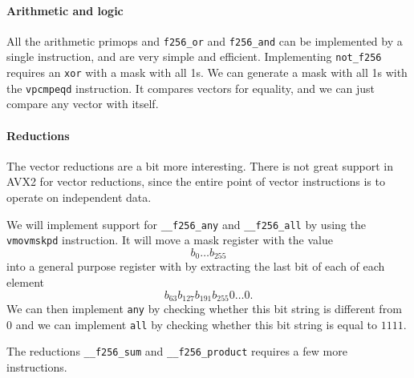 \documentclass{article}
\begin{document}
\paragraph{Arithmetic and logic}
All the arithmetic primops and \verb!f256_or! and \verb!f256_and! can be implemented by a single instruction, and are very simple and efficient. Implementing \verb!not_f256! requires an \verb!xor! with a mask with all 1s. We can generate a mask with all 1s with the \verb!vpcmpeqd! instruction. It compares vectors for equality, and we can just compare any vector with itself.

\paragraph{Reductions}
The vector reductions are a bit more interesting. There is not great support in AVX2 for vector reductions, since the entire point of vector instructions is to operate on independent data.

We will implement support for \verb!__f256_any! and \verb!__f256_all! by using the \verb!vmovmskpd! instruction. It will move a mask register with the value
\[
    b_0 \ldots b_{255}
\]
into a general purpose register with by extracting the last bit of each of each element
\[
    b_{63}b_{127}b_{191}b_{255}0\ldots0.
\]
We can then implement \verb!any! by checking whether this bit string is different from 0 and we can implement \verb!all! by checking whether this bit string is equal to $1111$.

The reductions \verb!__f256_sum! and \verb!__f256_product! requires a few more instructions.
\end{document}
